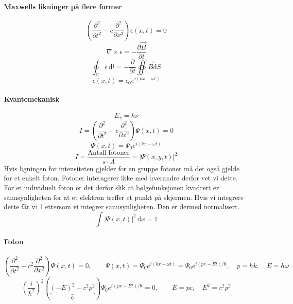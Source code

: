\paragraph{Maxwells likninger på flere former}
\[
\left( \frac{∂^2 }{∂ t^2} - c \frac{∂^2 }{∂ x^2} \right) ϵ (x,t) = 0
\]
\[
∇ × ϵ = - \frac{∂ \vec{B}}{∂ t}
\]
\[
\oint_{C} ϵ \ \mathrm{d}l =- \frac{∂ }{∂ t} \oiint  \vec{B} \mathrm{d}S 
\] 
\[
ϵ (x,t) = ϵ_0 e^{i(kx - ωt)}
\]
\paragraph{Kvantemekanisk}
\[
E_{γ} = hν
\]
\[
I = \left( \frac{∂^2}{∂ t^2} - c \frac{∂^2 }{∂ x^2} \right) Ψ(x,t) = 0
\]
\[
Ψ(x,t) = Ψ_0 e^{i(kx - ωt)}
\]
\[
I = \frac{\text{Antall fotoner}}{s ⋅ A} = \left| Ψ(x,y,t) \right| ^2
\]
Hvis ligningen for intensiteten gjelder for en gruppe fotoner må det også gjelde for et enkelt foton. Fotoner interagerer ikke med hverandre derfor vet vi dette. For et individuelt foton er det derfor slik at bølgefunksjonen kvadrert er sannsynligheten for at et elektron treffer et punkt på skjermen. Hvis vi integrere dette får vi 1 ettersom vi integrer sannsynligheten. Den er dermed normalisert. 
\[
∫ \left| Ψ(x,t) \right|^2 \ \mathrm{d}x  = 1
\]

\paragraph{Foton}
\[
\left( \frac{∂^2 }{∂ t^2} - c^2 \frac{∂^2 }{∂ x^2} \right) Ψ(x,t) = 0, \qquad Ψ(x,t) = Ψ_0 e^{i(kx - ωt)} = Ψ_0 e^{i(px -Et) / ℏ}, \quad p = ℏk, \quad E = ℏω
\]
\[
\left( \frac{i}{ℏ^2} \right)^2 \left( \underbrace{ \left( -E \right) ^2 - c^2 p^2}_{0}\right) Ψ_0 e^{i(px -Et) / ℏ} = 0, \qquad E = pc, \quad E^2 = c^2 p^2
\]

